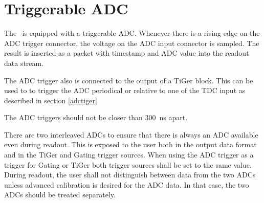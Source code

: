 {	\section{Triggerable ADC}
		\label{adc}
		The \deviceName\ is equipped with a triggerable ADC. 
		Whenever there is a rising edge on the ADC trigger connector, 
		the voltage on the ADC input connector is sampled. 
		The result is inserted as a packet with timestamp and ADC value into the readout data stream.

		The ADC trigger also is connected to the output of a TiGer block. 
		This can be used to to trigger the ADC periodical or relative to one of the TDC input as described in section \ref{adctiger}

		The ADC triggers should not be closer than \SI{300}{\nano\second} apart.

		There are two interleaved ADCs  to ensure that there is always an ADC available even during readout. 
		This is exposed to the user both in the output data format and in the TiGer and Gating trigger sources.
		When using the ADC trigger as a trigger for Gating or TiGer both trigger sources shall be set to the same value.
		During readout, the user shall not distinguish between data from the two ADCs unless advanced calibration is 
		desired for the ADC data. In that case, the two ADCs should be treated separately.   

}{}